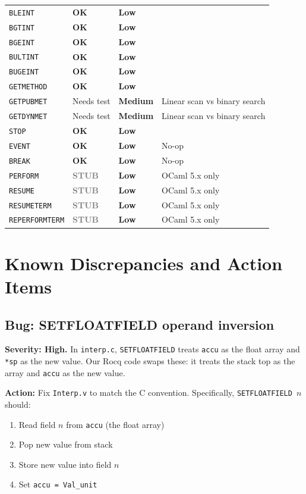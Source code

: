 \documentclass[11pt,a4paper]{article}
\newcommand{\statusok}{\textbf{\textcolor{green!50!black}{OK}}\xspace}
\newcommand{\statusstub}{\textbf{\textcolor{gray}{STUB}}\xspace}
\newcommand{\risklow}{\textcolor{green!50!black}{\textbf{Low}}\xspace}
\newcommand{\riskmed}{\textcolor{orange!80!black}{\textbf{Medium}}\xspace}
\begin{document}
\begin{longtable}{llll}
\texttt{BLEINT} & \statusok & \risklow & \\
\texttt{BGTINT} & \statusok & \risklow & \\
\texttt{BGEINT} & \statusok & \risklow & \\
\texttt{BULTINT} & \statusok & \risklow & \\
\texttt{BUGEINT} & \statusok & \risklow & \\
\midrule
\texttt{GETMETHOD} & \statusok & \risklow & \\
\texttt{GETPUBMET} & Needs test & \riskmed & Linear scan vs binary search \\
\texttt{GETDYNMET} & Needs test & \riskmed & Linear scan vs binary search \\
\midrule
\texttt{STOP} & \statusok & \risklow & \\
\texttt{EVENT} & \statusok & \risklow & No-op \\
\texttt{BREAK} & \statusok & \risklow & No-op \\
\texttt{PERFORM} & \statusstub & \risklow & OCaml 5.x only \\
\texttt{RESUME} & \statusstub & \risklow & OCaml 5.x only \\
\texttt{RESUMETERM} & \statusstub & \risklow & OCaml 5.x only \\
\texttt{REPERFORMTERM} & \statusstub & \risklow & OCaml 5.x only \\
\bottomrule
\end{longtable}


\section{Known Discrepancies and Action Items}
\label{sec:actions}

\subsection{Bug: SETFLOATFIELD operand inversion}
\label{action:setfloatfield}

\textbf{Severity: High.}
In \texttt{interp.c}, \texttt{SETFLOATFIELD} treats \texttt{accu} as the float
array and \texttt{*sp} as the new value.  Our Rocq code swaps these: it treats
the stack top as the array and \texttt{accu} as the new value.

\textbf{Action:} Fix \texttt{Interp.v} to match the C convention.
Specifically, \texttt{SETFLOATFIELD $n$} should:
\begin{enumerate}
  \item Read field $n$ from \texttt{accu} (the float array)
  \item Pop new value from stack
  \item Store new value into field $n$
  \item Set \texttt{accu = Val\_unit}
\end{enumerate}
\end{document}
